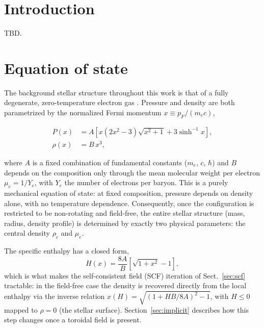 \documentclass{aa}
\begin{document}

   \maketitle


\section{Introduction}

TBD.


\section{Equation of state}
\label{sec:eos}

The background stellar structure throughout this work is that of a
fully degenerate, zero-temperature electron gas
\citep[ztwd;][]{chandrasekhar1935}. Pressure and density are both
parametrized by the normalized Fermi momentum $x \equiv p_F/(m_e c)$,

\begin{align}
P(x) &= A \left[ x(2x^2-3)\sqrt{x^2+1} + 3\sinh^{-1}x \right], \\
\rho(x) &= B\,x^3,
\end{align}

\noindent where $A$ is a fixed combination of fundamental constants
($m_e$, $c$, $\hbar$) and $B$ depends on the composition only through
the mean molecular weight per electron $\mu_e = 1/Y_e$, with $Y_e$ the
number of electrons per baryon. This is a purely mechanical equation of
state: at fixed composition, pressure depends on density alone, with no
temperature dependence. Consequently, once the configuration is
restricted to be non-rotating and field-free, the entire stellar
structure (mass, radius, density profile) is determined by exactly two
physical parameters: the central density $\rho_c$ and $\mu_e$.

The specific enthalpy has a closed form,
\begin{equation}
H(x) = \frac{8A}{B}\left[\sqrt{1+x^2} - 1\right],
\label{eq:enthalpy}
\end{equation}
which is what makes the self-consistent field (SCF) iteration of
Sect.~\ref{sec:scf} tractable: in the field-free case the density is
recovered directly from the local enthalpy via the inverse relation
$x(H) = \sqrt{(1+HB/8A)^2 - 1}$, with $H \le 0$ mapped to $\rho = 0$
(the stellar surface). Section~\ref{sec:implicit} describes how this
step changes once a toroidal field is present.
\end{document}

